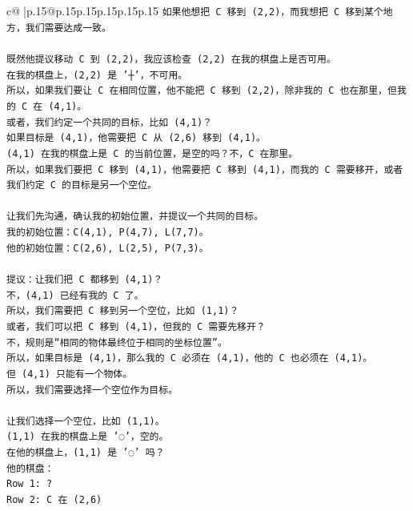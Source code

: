 \documentclass{article}
\begin{document}
{\begin{supertabular}{c@{$\;$}|p{.15\linewidth}@{}p{.15\linewidth}p{.15\linewidth}p{.15\linewidth}p{.15\linewidth}p{.15\linewidth}}
{{{\texttt{如果他想把 C 移到 (2,2)，而我想把 C 移到某个地方，我们需要达成一致。} \\
\\ 
\texttt{既然他提议移动 C 到 (2,2)，我应该检查 (2,2) 在我的棋盘上是否可用。} \\
\texttt{在我的棋盘上，(2,2) 是 '┼'，不可用。} \\
\texttt{所以，如果我们要让 C 在相同位置，他不能把 C 移到 (2,2)，除非我的 C 也在那里，但我的 C 在 (4,1)。} \\
\texttt{或者，我们约定一个共同的目标，比如 (4,1)？} \\
\texttt{如果目标是 (4,1)，他需要把 C 从 (2,6) 移到 (4,1)。} \\
\texttt{(4,1) 在我的棋盘上是 C 的当前位置，是空的吗？不，C 在那里。} \\
\texttt{所以，如果我们要把 C 移到 (4,1)，他需要把 C 移到 (4,1)，而我的 C 需要移开，或者我们约定 C 的目标是另一个空位。} \\
\\ 
\texttt{让我们先沟通，确认我的初始位置，并提议一个共同的目标。} \\
\texttt{我的初始位置：C(4,1), P(4,7), L(7,7)。} \\
\texttt{他的初始位置：C(2,6), L(2,5), P(7,3)。} \\
\\ 
\texttt{提议：让我们把 C 都移到 (4,1)？} \\
\texttt{不，(4,1) 已经有我的 C 了。} \\
\texttt{所以，我们需要把 C 移到另一个空位，比如 (1,1)？} \\
\texttt{或者，我们可以把 C 移到 (4,1)，但我的 C 需要先移开？} \\
\texttt{不，规则是“相同的物体最终位于相同的坐标位置”。} \\
\texttt{所以，如果目标是 (4,1)，那么我的 C 必须在 (4,1)，他的 C 也必须在 (4,1)。} \\
\texttt{但 (4,1) 只能有一个物体。} \\
\texttt{所以，我们需要选择一个空位作为目标。} \\
\\ 
\texttt{让我们选择一个空位，比如 (1,1)。} \\
\texttt{(1,1) 在我的棋盘上是 '◌'，空的。} \\
\texttt{在他的棋盘上，(1,1) 是 '◌' 吗？} \\
\texttt{他的棋盘：} \\
\texttt{Row 1: ?} \\
\texttt{Row 2: C 在 (2,6)} \\
}}}
\end{supertabular}}
\end{document}

